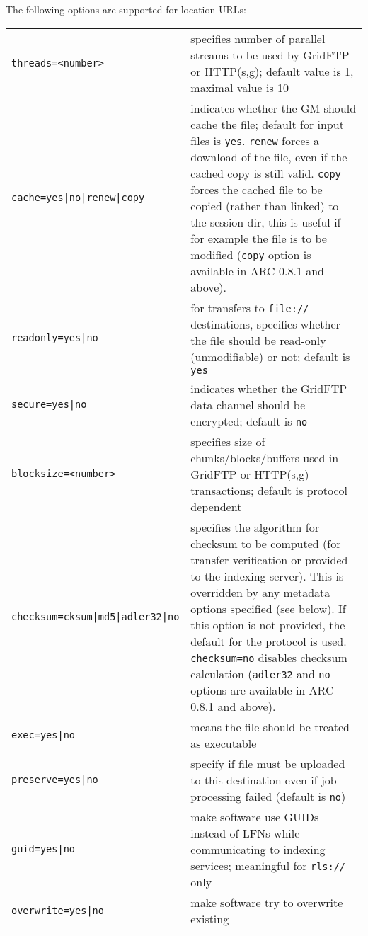 The following options are supported for location URLs:

\begin{longtable}{lp{10cm}}
   \verb#threads=<number># & specifies number of parallel
   streams to be used by GridFTP or HTTP(s,g); default value is 1,
   maximal value is 10\\
   \verb#cache=yes|no|renew|copy# & indicates whether the GM should
   cache the file; default for input files is \verb#yes#. \verb#renew#
   forces a download of the file, even if the cached copy is still valid.
   \verb#copy# forces the cached file to be copied (rather than linked) to
   the session dir, this is useful if for example the file is to be modified
   (\verb#copy# option is available in ARC 0.8.1 and above).\\
   \verb#readonly=yes|no# & for transfers to \verb#file://# destinations,
    specifies whether the file should be
   read-only (unmodifiable) or not; default is \verb#yes# \\
   \verb#secure=yes|no# & indicates whether the GridFTP data
   channel should be encrypted; default is \verb#no#\\
   \verb#blocksize=<number># & specifies size of
   chunks/blocks/buffers used in GridFTP or HTTP(s,g) transactions;
   default is protocol dependent\\
   \verb#checksum=cksum|md5|adler32|no# & specifies the algorithm for checksum to be
   computed (for transfer verification or provided to the indexing server). This is overridden
   by any metadata options specified (see below). If this option is
   not provided, the default for the protocol is used. \verb#checksum=no#
   disables checksum calculation (\verb#adler32# and \verb#no# options are
   available in ARC 0.8.1 and above).\\
   \verb#exec=yes|no# & means the file should be treated as executable\\
   \verb#preserve=yes|no# & specify if file must be uploaded to this
   destination even if job processing failed (default is \verb#no#)\\
   \verb#guid=yes|no# & make software use GUIDs instead of LFNs while
   communicating to indexing services; meaningful for \verb#rls://#
   only\\
   \verb#overwrite=yes|no# & make software try to overwrite existing

\end{longtable}
